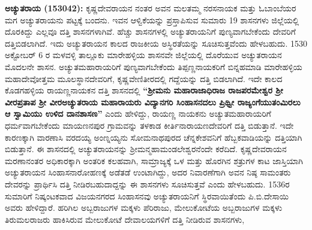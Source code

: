 \textbf{ಅಚ್ಯುತರಾಯ (153042):} ಕೃಷ್ಣದೇವರಾಯನ ನಂತರ ಅವನ ಮಲತಮ್ಮ ನರಸನಾಯಕ ಮತ್ತು ಓಬಾಂಬೆಯರ ಮಗ ಅಚ್ಯುತರಾಯನು ಪಟ್ಟಕ್ಕೆ ಬಂದನು. ಇವನ ಆಳ್ವಿಕೆಯನ್ನು ಪ್ರಸ್ತಾಪಿಸುವ ಸುಮಾರು 19 ಶಾಸನಗಳು ಜಿಲ್ಲೆಯಲ್ಲಿ ದೊರಕಿದ್ದು ಎಲ್ಲವೂ ದತ್ತಿ ಶಾಸನಗಳಾಗಿವೆ. ಹೆಚ್ಚು ಶಾಸನಗಳಲ್ಲಿ ಅಚ್ಯುತರಾಯನಿಗೆ ಪುಣ್ಯವಾಗಬೇಕೆಂದು ದೇವರಿಗೆ ದತ್ತಿಬಿಡಲಾಗಿದೆ. ಇದು ಅಚ್ಯುತರಾಯನ ಕಾಲದ ರಾಜಕೀಯ ಅಸ್ಥಿರತೆಯನ್ನು ಸೂಚಿಸುತ್ತವೆಂದು ಹೇಳಬಹುದು. 1530 ಅಕ್ಟೋಬರ್​ 6 ರ ಮಳವಳ್ಳಿ ತಾಲ್ಲೂಕು ಮಾರೇಹಳ್ಳಿಯ ಶಾಸನವೇ ಜಿಲ್ಲೆಯಲ್ಲಿ ದೊರೆಯುವ ಅಚ್ಯುತರಾಯನ ಮೊದಲನೇ ಶಾಸನ. ಅಚ್ಯುತಮಹಾರಾಯರಿಗೆ ಪುಣ್ಯವಾಗಬೇಕೆಂದು ತಿಪ್ಪಣ್ಣನಾಯಕರಿಗೆ ಬಿನ್ನಹಮಾಡಿ ಮಾರೇಹಳ್ಳಿಯ ಮಹಾದೇವೋತ್ತಮ ಮೂಲಸ್ಥಾನದೇವರಿಗೆ, ಕೃಷ್ಣವೇಣಿತೀರದಲ್ಲಿ ಗದ್ದೆಯನ್ನು ದತ್ತಿ ಬಿಡಲಾಗಿದೆ. ಇದೇ ಕಾಲದ ಕೊಡಗಹಳ್ಳಿಯ ರಾಯಣ್ಣನಾಯಕನ ದತ್ತಿ ಶಾಸನದಲ್ಲಿ \textbf{“ಶ‍್ರೀಮನು ಮಹಾರಾಜಾಧಿರಾಜ ರಾಜಪರಮೇಶ್ವರ ಶ‍್ರೀ ವೀರಪ್ರತಾಪ ಶ‍್ರೀ ವೀರಅಚ್ಯುತರಾಯ ಮಹಾರಾಯರು ವಿದ್ಯಾನಗರಿ ಸಿಂಹಾಸನದಲು ಪ್ರಿಥ್ವೀ ರಾಜ್ಯಂಗೆಯುತಂಮಿರಲು ಆ ಸ್ವಾಮಿಯು ಉಳಿದ ದಾನಶಾಸಣ”} ಎಂದು ಹೇಳಿದ್ದು, ರಾಯಣ್ಣ ನಾಯಕನು ಅಚ್ಯುತಮಹಾರಾಯರಿಗೆ ಧರ್ಮವಾಗಬೇಕೆಂದು ಮಾಯಣನಪುರ ಗ್ರಾಮವನ್ನು ತಳಕಾಡ ಕೀರ್ತಿನಾರಾಯಣದೇವರಿಗೆ ದತ್ತಿ ಬಿಡುತ್ತಾನೆ. ಇದೇ ಕಾರಣಕ್ಕಾಗಿ ವಾರಣಾಸಿ ವರದಯ್ಯ ಅಂಣ್ನಯ್ಯನು ಸೋಮನಾಥಪುರದ ಚೆನ್ನಕೇಶವನಿಗೆ ಹೆಬ್ಬಕವಾಡಿಯನ್ನು ದತ್ತಿಯಾಗಿ ಬಿಡುತ್ತಾನೆ. ಈ ಶಾಸನದಲ್ಲಿ ಅಚ್ಯುತರಾಯನನ್ನು ಶ‍್ರೀಮನ್ಮಹಾಮಂಡಲೇಶ್ವರನೆಂದೇ ಕರೆದಿದೆ. ಕೃಷ್ಣದೇವರಾಯನ ಮರಣಾನಂತರ ಅಧಿಕಾರಕ್ಕಾಗಿ ಅಂತರಿಕ ಕಲಹವಾಗಿ, ಸಾಮ್ರಾಜ್ಯಕ್ಕೆ ಒಳ ಮತ್ತು ಹೊರಗಿನ ಶತ್ರುಗಳ ಕಾಟ ಜಾಸ್ತಿಯಾಗಿ ಅಚ್ಯುತರಾಯನ ಸಿಂಹಾಸನಾರೋಹಣಕ್ಕೆ ಅಡೆತಡೆ ಉಂಟಾಗಿದ್ದು, ಅದರ ನಿವಾರಣೆಗಾಗಿ ಅವನ ನಿಷ್ಠ ಸಾಮಂತರು ದೇವರನ್ನು ಪ್ರಾರ್ಥಿಸಿ ದತ್ತಿ ನೀಡಿರಬಹುದಾದ್ದನ್ನು ಈ ಶಾಸನಗಳು ಸೂಚಿಸುತ್ತವೆ ಎಂದು ಹೇಳಬಹುದು. 1536ರ ಸುಮಾರಿಗೆ ನಿಷ್ಕಂಟಕವಾದ ವಿಜಯನಗರದ ಸಿಂಹಾಸನವು ಅಚ್ಯುತರಾಯನಿಗೆ ಸ್ಥಿರವಾಯಿತೆಂದು ಪಿ.ಬಿ.ದೇಸಾಯಿ ಅವರು ಹೇಳಿದ್ದಾರೆ. ಹರಿಗಿಲ ಅಬ್ಬರಾಜುಗಳ ಮಕ್ಕಳು ಪೆರಿರಾಜು, ಮೇಲುಕೋಟೆಯ ಅಬ್ಬರಾಜುಗಳ ಮಕ್ಕಳು ತಿರುಮಲರಾಜರು ಹಾಕಿಸಿರುವ ಮೇಲುಕೋಟೆ ದೇವಾಲಯಗಳಿಗೆ ದತ್ತಿ ನೀಡಿರುವ ಶಾಸನಗಳು,
